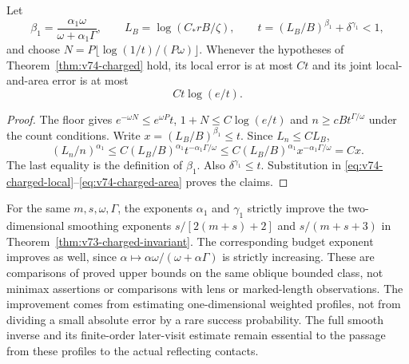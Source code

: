 \begin{corollary}
\label{cor:v74-budget}
Let
\[
 \beta_1=\frac{\alpha_1\omega}{\omega+\alpha_1\Gamma},\qquad
 L_B=\log(C_*rB/\zeta),\qquad
 t=(L_B/B)^{\beta_1}+\delta^{\gamma_1}<1,
\]
and choose $N=P\lfloor\log(1/t)/(P\omega)\rfloor$.
Whenever the hypotheses of Theorem~\ref{thm:v74-charged} hold,
its local error is at most $Ct$ and its joint local-and-area error
is at most
\begin{equation}\label{eq:v74-budget}
                            Ct\log(e/t).
\end{equation}
\end{corollary}
\begin{proof}
The floor gives $e^{-\omega N}\le e^{\omega P}t$,
$1+N\le C\log(e/t)$ and $n\ge cBt^{\Gamma/\omega}$ under the
count conditions.  Write $x=(L_B/B)^{\beta_1}\le t$.  Since
$L_n\le CL_B$,
\[
 (L_n/n)^{\alpha_1}
 \le C(L_B/B)^{\alpha_1}t^{-\alpha_1\Gamma/\omega}
 \le C(L_B/B)^{\alpha_1}x^{-\alpha_1\Gamma/\omega}=Cx.
\]
The last equality is the definition of $\beta_1$.
Also $\delta^{\gamma_1}\le t$.  Substitution in
\eqref{eq:v74-charged-local}--\eqref{eq:v74-charged-area} proves
the claims.
\end{proof}

For the same $m,s,\omega,\Gamma$, the exponents $\alpha_1$ and
$\gamma_1$ strictly improve the two-dimensional smoothing exponents
$s/[2(m+s)+2]$ and $s/(m+s+3)$ in
Theorem~\ref{thm:v73-charged-invariant}.  The corresponding budget
exponent improves as well, since
$\alpha\mapsto\alpha\omega/(\omega+\alpha\Gamma)$ is strictly
increasing.  These are comparisons of proved upper bounds on the same
oblique bounded class, not minimax assertions or comparisons with lens
or marked-length observations.  The improvement comes from estimating
one-dimensional weighted profiles, not from dividing a small absolute
error by a rare success probability.  The full smooth inverse and its
finite-order later-visit estimate remain essential to the passage from
these profiles to the actual reflecting contacts.

